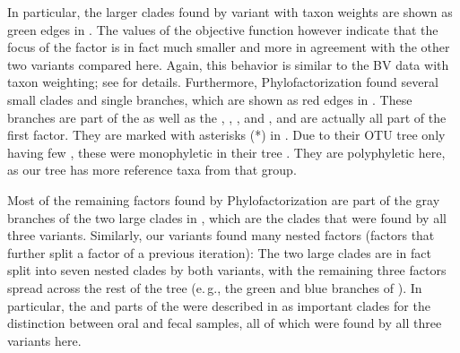 In particular, the larger clades found by variant with taxon weights
are shown as green edges in .
The values of the objective function however indicate that the focus of the factor is in fact much smaller
and more in agreement with the other two variants compared here.
Again, this behavior is similar to the \ac{BV} data with taxon weighting;
see  for details.
Furthermore, Phylofactorization found several small clades and single branches,
which are shown as red edges in .
These branches are part of the  as well as the \mbox{,} \mbox{,}
\mbox{,} and , and are actually all part of the first factor.
They are marked with asterisks (*) in .
Due to their OTU tree only having few ,
these were monophyletic in their tree \cite{Washburne2017a}.
They are polyphyletic here, as our tree has more reference taxa from that group.

Most of the remaining factors found by Phylofactorization are part of the gray branches
of the two large clades in ,
which are the clades that were found by all three variants.
Similarly, our variants found many nested factors (factors that further split a factor of a previous iteration):
The two large clades are in fact split into seven nested clades by both variants,
with the remaining three factors spread across the rest of the tree
(e.\,g., the green and blue branches of ).
In particular, the  and parts of the 
were described in  as important clades for the distinction between oral and fecal samples,
all of which were found by all three variants here.


